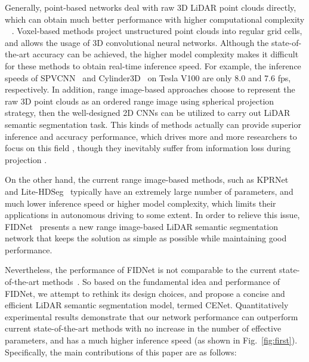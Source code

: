 \documentclass{article}
\begin{document}
Generally, point-based networks deal with raw 3D LiDAR point clouds directly, which can obtain much better performance with higher computational complexity ~\cite{thomas2019kpconv} \cite{hu2020randla}. Voxel-based methods project unstructured point clouds into regular grid cells, and allows the usage of 3D convolutional neural networks. Although the state-of-the-art accuracy can be achieved, the higher model complexity makes it difficult for these methods to obtain real-time inference speed. For example, the inference speeds of SPVCNN~\cite{tang2020searching} and Cylinder3D~\cite{zhou2020cylinder3d} on Tesla V100 are only 8.0 and 7.6 fps, respectively. In addition, range image-based approaches choose to represent the raw 3D point clouds as an ordered range image using spherical projection strategy, then the well-designed 2D CNNs can be utilized to carry out LiDAR semantic segmentation task. This kinds of methods actually can provide superior inference and accuracy performance, which drives more and more researchers to focus on this field \cite{fan2021rangedet}, though they inevitably suffer from information loss during projection \cite{guo2020deep}. 


On the other hand, the current range image-based methods, such as KPRNet~\cite{kochanov2020kprnet} and Lite-HDSeg~\cite{Lite-HDSeg} typically have an extremely large number of parameters, and much lower inference speed or higher model complexity, which limits their applications in autonomous driving to some extent. In order to relieve this issue, FIDNet~\cite{zhao2021fidnet} presents a new range image-based LiDAR semantic segmentation network that keeps the solution as simple as possible while maintaining good performance.  


Nevertheless, the performance of FIDNet is not comparable to the current state-of-the-art methods~\cite{qiu2021semantic, tang2020searching, Lite-HDSeg}. So based on the fundamental idea and performance of FIDNet, we attempt to rethink its design choices, and propose a concise and efficient LiDAR semantic segmentation model, termed CENet. Quantitatively experimental results demonstrate that our network performance can outperform current state-of-the-art methods with no increase in the number of effective parameters, and has a much higher inference speed (as shown in Fig.~\ref{fig:first}). Specifically, the main contributions of this paper are as follows:
\end{document}

